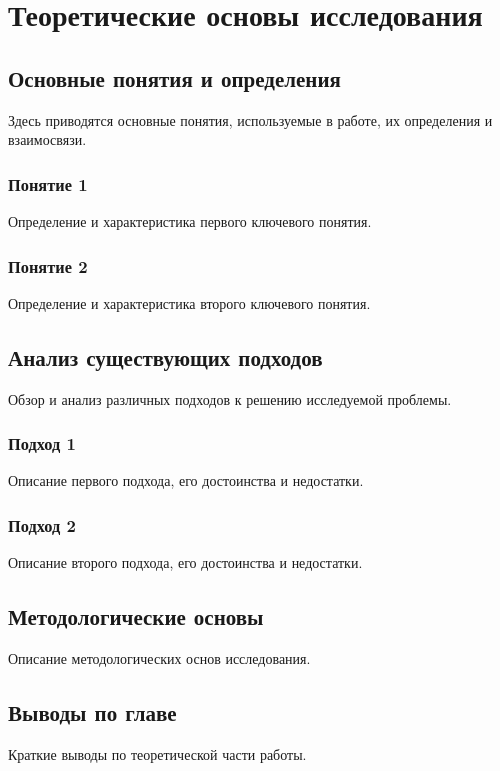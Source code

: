 \chapter{Теоретические основы исследования}

\section{Основные понятия и определения}

Здесь приводятся основные понятия, используемые в работе, их определения и взаимосвязи.

\subsection{Понятие 1}

Определение и характеристика первого ключевого понятия.

\subsection{Понятие 2}

Определение и характеристика второго ключевого понятия.

\section{Анализ существующих подходов}

Обзор и анализ различных подходов к решению исследуемой проблемы.

\subsection{Подход 1}

Описание первого подхода, его достоинства и недостатки.

\subsection{Подход 2}

Описание второго подхода, его достоинства и недостатки.

\section{Методологические основы}

Описание методологических основ исследования.

\section{Выводы по главе}

Краткие выводы по теоретической части работы.
